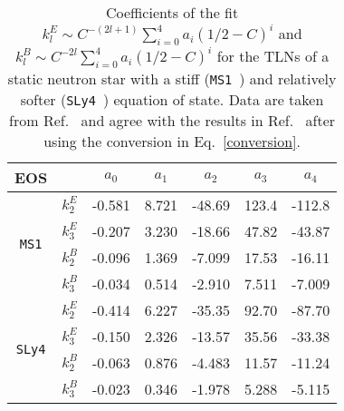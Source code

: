 \documentclass[aps,twocolumn,showpacs,preprintnumbers,nofootinbib,prd,superscriptaddress,groupedaddress,10pt]{revtex4-1}
\begin{document}
%
\begin{table*}[ht]
\centering
\caption{\footnotesize Coefficients of the fit $k_l^{E}\sim C^{-(2l+1)}\sum_{i=0}^4 a_i (1/2-C)^i$ and $k_l^{B}\sim C^{-2l}\sum_{i=0}^4 a_i (1/2-C)^i$ for the TLNs of a static neutron star with a stiff (\texttt{MS1}~\cite{Mueller:1996pm}) and relatively softer (\texttt{SLy4}~\cite{Douchin:2001sv}) equation of state. Data are taken from Ref.~\cite{Pani:2015hfa} and agree with the results in Ref.~\cite{Binnington:2009bb} after using the conversion in Eq.~\eqref{conversion}.}
\label{tab:EOS}
\begin{tabular}{|c|cccccc|} 
\hline
\hline
 EOS 	      & 		& $a_0$ & $a_1$ & $a_2$ & $a_3$ & $a_4$  \\
 \hline
 \multirow{4}{*}{\texttt{MS1}} & $k_2^E$  & -0.581& 8.721& -48.69& 123.4& -112.8  \\
			       & $k_3^E$  & -0.207& 3.230& -18.66& 47.82& -43.87 \\
			       & $k_2^B$  & -0.096& 1.369& -7.099& 17.53& -16.11 \\
			       & $k_3^B$  & -0.034& 0.514& -2.910& 7.511& -7.009 \\			     
  \hline
 \multirow{4}{*}{\texttt{SLy4}} & $k_2^E$  & -0.414& 6.227& -35.35& 92.70& -87.70  \\
				& $k_3^E$  & -0.150& 2.326& -13.57& 35.56& -33.38 \\
				& $k_2^B$  & -0.063& 0.876& -4.483& 11.57& -11.24 \\
				& $k_3^B$  & -0.023& 0.346& -1.978& 5.288& -5.115 \\						
\hline
\hline
\end{tabular}
\end{table*}
%

\end{document}
